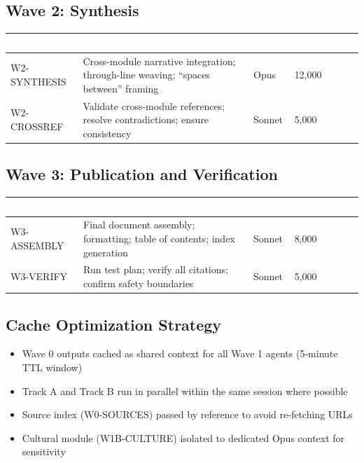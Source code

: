 \documentclass[11pt,letterpaper]{article}
\newcommand{\tableheader}[1]{\textbf{\sffamily\textcolor{white}{#1}}}
\begin{document}
\subsection{Wave 2: Synthesis}

\begin{center}
\begin{tabularx}{\textwidth}{L{2.5cm}XC{1.5cm}C{2cm}}
\toprule
{}
\tableheader{Component} & \tableheader{Description} & \tableheader{Model} & \tableheader{Est.\ Tokens} \\
\midrule
W2-SYNTHESIS & Cross-module narrative integration; through-line weaving; ``spaces between'' framing & Opus & 12,000 \\
W2-CROSSREF & Validate cross-module references; resolve contradictions; ensure consistency & Sonnet & 5,000 \\
\bottomrule
\end{tabularx}
\end{center}

\subsection{Wave 3: Publication and Verification}

\begin{center}
\begin{tabularx}{\textwidth}{L{2.5cm}XC{1.5cm}C{2cm}}
\toprule
{}
\tableheader{Component} & \tableheader{Description} & \tableheader{Model} & \tableheader{Est.\ Tokens} \\
\midrule
W3-ASSEMBLY & Final document assembly; formatting; table of contents; index generation & Sonnet & 8,000 \\
W3-VERIFY & Run test plan; verify all citations; confirm safety boundaries & Sonnet & 5,000 \\
\bottomrule
\end{tabularx}
\end{center}

\subsection{Cache Optimization Strategy}

\begin{itemize}[leftmargin=2em]
  \item Wave 0 outputs cached as shared context for all Wave 1 agents (5-minute TTL window)
  \item Track A and Track B run in parallel within the same session where possible
  \item Source index (W0-SOURCES) passed by reference to avoid re-fetching URLs
  \item Cultural module (W1B-CULTURE) isolated to dedicated Opus context for sensitivity
\end{itemize}
\end{document}

